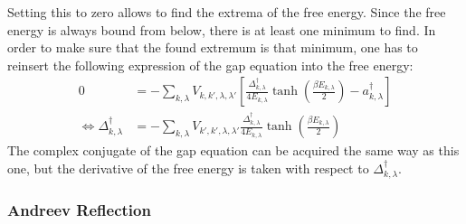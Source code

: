 Setting this to zero allows to find the extrema of the free energy. 
Since the free energy is always bound from below, there is at least one minimum to find. 
In order to make sure that the found extremum is that minimum, one has to reinsert the following expression of the gap equation into the free energy:
\begin{align}
    0 &= -\sum_{k, \lambda} V_{k,k', \lambda, \lambda'}\left[ \frac{\Delta^{\dag}_{k, \lambda}}{4 E_{k, \lambda}}\tanh{\left( \frac{\beta E_{k, \lambda}}{2}\right)} - a^{\dag}_{k, \lambda}\right] \nonumber \\ \label{eq:selfconsistencyGap}
    \Leftrightarrow \Delta^{\dag}_{k, \lambda} &= - \sum_{k, \lambda} V_{k',k', \lambda, \lambda'}\frac{\Delta^{\dag}_{k, \lambda}}{4 E_{k, \lambda}}\tanh{\left( \frac{\beta E_{k, \lambda}}{2}\right)}
\end{align}
The complex conjugate of the gap equation can be acquired the same way as this one, but the derivative of the free energy is taken with respect to $\Delta^{\dag}_{k, \lambda}$.
\subsubsection{Andreev Reflection} \label{sec:andreev}

